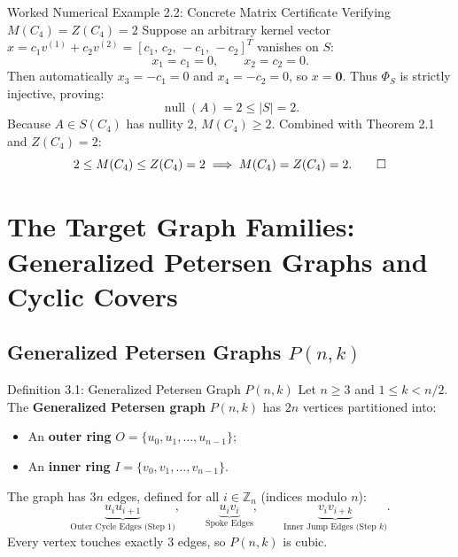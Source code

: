 \documentclass[11pt]{article}
\begin{document}
\begin{callbox}{Worked Numerical Example 2.2: Concrete Matrix Certificate Verifying $M(C_4) = Z(C_4) = 2$}
Suppose an arbitrary kernel vector $x = c_1 v^{(1)} + c_2 v^{(2)} = [c_1, \, c_2, \, -c_1, \, -c_2]^T$ vanishes on $S$:
\begin{equation}
  x_1 = c_1 = 0, \qquad x_2 = c_2 = 0.
\end{equation}
Then automatically $x_3 = -c_1 = 0$ and $x_4 = -c_2 = 0$, so $x = \mathbf{0}$.
Thus $\Phi_S$ is strictly injective, proving:
\begin{equation}
  \operatorname{null}(A) = 2 \le |S| = 2.
\end{equation}
Because $A \in S(C_4)$ has nullity 2, $M(C_4) \ge 2$. Combined with Theorem 2.1 and $Z(C_4)=2$:
\begin{equation}
  2 \le M(C_4) \le Z(C_4) = 2 \implies M(C_4) = Z(C_4) = 2. \qedhere
\end{equation}
\end{callbox}

\newpage

\section{The Target Graph Families: Generalized Petersen Graphs and Cyclic Covers}

\subsection{Generalized Petersen Graphs $P(n,k)$}

\begin{defbox}{Definition 3.1: Generalized Petersen Graph $P(n,k)$}
Let $n \ge 3$ and $1 \le k < n/2$. The \textbf{Generalized Petersen graph} $P(n,k)$ has $2n$ vertices partitioned into:
\begin{itemize}[leftmargin=*,nosep]
  \item An \textbf{outer ring} $O = \{u_0, u_1, \dots, u_{n-1}\}$;
  \item An \textbf{inner ring} $I = \{v_0, v_1, \dots, v_{n-1}\}$.
\end{itemize}
The graph has $3n$ edges, defined for all $i \in \mathbb{Z}_n$ (indices modulo $n$):
\begin{equation}
  \underbrace{u_i u_{i+1}}_{\text{Outer Cycle Edges (Step 1)}}, \qquad
  \underbrace{u_i v_i}_{\text{Spoke Edges}}, \qquad
  \underbrace{v_i v_{i+k}}_{\text{Inner Jump Edges (Step } k)}.
\end{equation}
Every vertex touches exactly 3 edges, so $P(n,k)$ is cubic.
\end{defbox}
\end{document}
